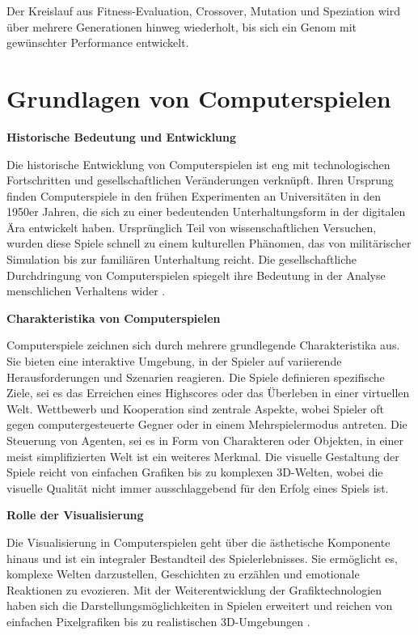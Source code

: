 Der Kreislauf aus Fitness-Evaluation, Crossover, Mutation und Speziation wird über mehrere Generationen hinweg wiederholt, bis sich ein Genom mit gewünschter Performance entwickelt.

\section{Grundlagen von Computerspielen}

\textbf{Historische Bedeutung und Entwicklung}

Die historische Entwicklung von Computerspielen ist eng mit technologischen Fortschritten und gesellschaftlichen Veränderungen verknüpft. Ihren Ursprung finden Computerspiele in den frühen Experimenten an Universitäten in den 1950er Jahren, die sich zu einer bedeutenden Unterhaltungsform in der digitalen Ära entwickelt haben. Ursprünglich Teil von wissenschaftlichen Versuchen, wurden diese Spiele schnell zu einem kulturellen Phänomen, das von militärischer Simulation bis zur familiären Unterhaltung reicht. Die gesellschaftliche Durchdringung von Computerspielen spiegelt ihre Bedeutung in der Analyse menschlichen Verhaltens wider \cite{Huizinga1939}.

\textbf{Charakteristika von Computerspielen}

Computerspiele zeichnen sich durch mehrere grundlegende Charakteristika aus. Sie bieten eine interaktive Umgebung, in der Spieler auf variierende Herausforderungen und Szenarien reagieren. Die Spiele definieren spezifische Ziele, sei es das Erreichen eines Highscores oder das Überleben in einer virtuellen Welt. Wettbewerb und Kooperation sind zentrale Aspekte, wobei Spieler oft gegen computergesteuerte Gegner oder in einem Mehrspielermodus antreten. Die Steuerung von Agenten, sei es in Form von Charakteren oder Objekten, in einer meist simplifizierten Welt ist ein weiteres Merkmal. Die visuelle Gestaltung der Spiele reicht von einfachen Grafiken bis zu komplexen 3D-Welten, wobei die visuelle Qualität nicht immer ausschlaggebend für den Erfolg eines Spiels ist.

\textbf{Rolle der Visualisierung}

Die Visualisierung in Computerspielen geht über die ästhetische Komponente hinaus und ist ein integraler Bestandteil des Spielerlebnisses. Sie ermöglicht es, komplexe Welten darzustellen, Geschichten zu erzählen und emotionale Reaktionen zu evozieren. Mit der Weiterentwicklung der Grafiktechnologien haben sich die Darstellungsmöglichkeiten in Spielen erweitert und reichen von einfachen Pixelgrafiken bis zu realistischen 3D-Umgebungen \cite{COMP}.

